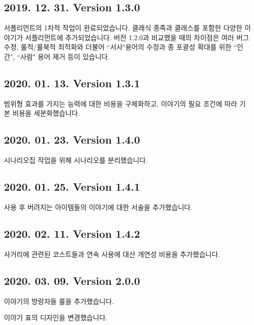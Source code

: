 \documentclass{report}
\begin{document}
	\subsection*{2019. 12. 31. Version 1.3.0}
	서플리먼트의 1차적 작업이 완료되었습니다. 클래식 종족과 클래스를 포함한 다양한 이야기가 서플리먼트에 추가되었습니다. 버전 1.2.0과 비교했을 때의 차이점은 여러 버그 수정, 룰적/룰북적 최적화와 더불어 ``서사"용어의 수정과 종 포괄성 확대를 위한 ``인간", ``사람" 용어 제거 등이 있습니다.
	
	\subsection*{2020. 01. 13. Version 1.3.1}
	범위형 효과를 가지는 능력에 대한 비용을 구체화하고, 이야기의 필요 조건에 따라 기본 비용을 세분화했습니다.
	
	\subsection*{2020. 01. 23. Version 1.4.0}
	시나리오집 작업을 위해 시나리오를 분리했습니다.
	
	\subsection*{2020. 01. 25. Version 1.4.1}
	사용 후 버려지는 아이템들의 이야기에 대한 서술을 추가했습니다.
	
	\subsection*{2020. 02. 11. Version 1.4.2}
	사거리에 관련된 코스트들과 연속 사용에 대산 개연성 비용을 추가했습니다.
\fi
	
	\subsection*{2020. 03. 09. Version 2.0.0}
	이야기의 방랑자들 룰을 추가했습니다.
	
	이야기 표의 디자인을 변경했습니다.
\end{document}
